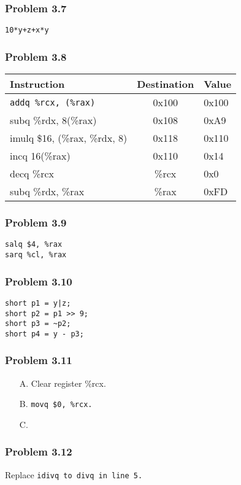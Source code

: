 \documentclass[a4paper]{article}
\begin{document}
\subsubsection*{Problem 3.7}
\tt{10*y+z+x*y}

\subsubsection*{Problem 3.8}
\begin{tabular}{lcl}
    Instruction&Destination&Value\\\hline
    \tt{addq \%rcx, (\%rax)}&0x100&0x100\\
    subq \%rdx, 8(\%rax)&0x108&0xA9\\
    imulq \$16, (\%rax, \%rdx, 8)&0x118&0x110\\
    incq 16(\%rax)&0x110&0x14\\
    decq \%rcx&\%rcx&0x0\\
    subq \%rdx, \%rax&\%rax&0xFD
    
\end{tabular}

\subsubsection*{Problem 3.9}
\begin{lstlisting}
salq $4, %rax
sarq %cl, %rax
\end{lstlisting}

\subsubsection*{Problem 3.10}
\begin{lstlisting}
short p1 = y|z;
short p2 = p1 >> 9;
short p3 = ~p2;
short p4 = y - p3;
\end{lstlisting}

\subsubsection*{Problem 3.11}
\begin{enumerate}
    \rm{}
    \item[A.] Clear register \%rcx.
    \item[B.] \tt{movq \$0, \%rcx}\rm{}.
    \item[C.]  
\end{enumerate}

\subsubsection*{Problem 3.12}
\rm{Replace} \tt{idivq} \rm{to} \tt{divq} \rm{}in line 5.
\end{document}
